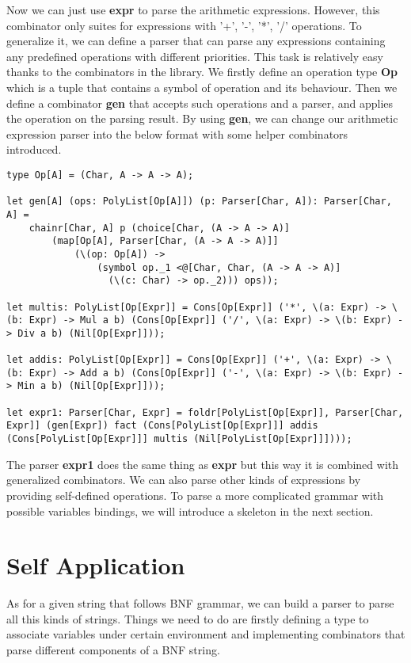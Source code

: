 Now we can just use \textbf{expr} to parse the arithmetic expressions. However, this combinator only suites for expressions with '+', '-', '*', '/' operations. To generalize it, we can define a parser that can parse any expressions containing any predefined operations with different priorities. This task is relatively easy thanks to the combinators in the library. We firstly define an operation type \textbf{Op} which is a tuple that contains a symbol of operation and its behaviour. Then we define a combinator \textbf{gen} that accepts such operations and a parser, and applies the operation on the parsing result. By using \textbf{gen}, we can change our arithmetic expression parser into the below format with some helper combinators introduced.
\begin{lstlisting}
type Op[A] = (Char, A -> A -> A);

let gen[A] (ops: PolyList[Op[A]]) (p: Parser[Char, A]): Parser[Char, A] =
    chainr[Char, A] p (choice[Char, (A -> A -> A)] 
        (map[Op[A], Parser[Char, (A -> A -> A)]] 
            (\(op: Op[A]) -> 
                (symbol op._1 <@[Char, Char, (A -> A -> A)] 
                  (\(c: Char) -> op._2))) ops));
                  
let multis: PolyList[Op[Expr]] = Cons[Op[Expr]] ('*', \(a: Expr) -> \(b: Expr) -> Mul a b) (Cons[Op[Expr]] ('/', \(a: Expr) -> \(b: Expr) -> Div a b) (Nil[Op[Expr]]));

let addis: PolyList[Op[Expr]] = Cons[Op[Expr]] ('+', \(a: Expr) -> \(b: Expr) -> Add a b) (Cons[Op[Expr]] ('-', \(a: Expr) -> \(b: Expr) -> Min a b) (Nil[Op[Expr]]));

let expr1: Parser[Char, Expr] = foldr[PolyList[Op[Expr]], Parser[Char, Expr]] (gen[Expr]) fact (Cons[PolyList[Op[Expr]]] addis (Cons[PolyList[Op[Expr]]] multis (Nil[PolyList[Op[Expr]]])));
\end{lstlisting}
The parser \textbf{expr1} does the same thing as \textbf{expr} but this way it is combined with generalized combinators. We can also parse other kinds of expressions by providing self-defined operations. To parse a more complicated grammar with possible variables bindings, we will introduce a skeleton in the next section.

\section{Self Application}
As for a given string that follows BNF grammar, we can build a parser to parse all this kinds of strings. Things we need to do are firstly defining a type to associate variables under certain environment and implementing combinators that parse different components of a BNF string.

